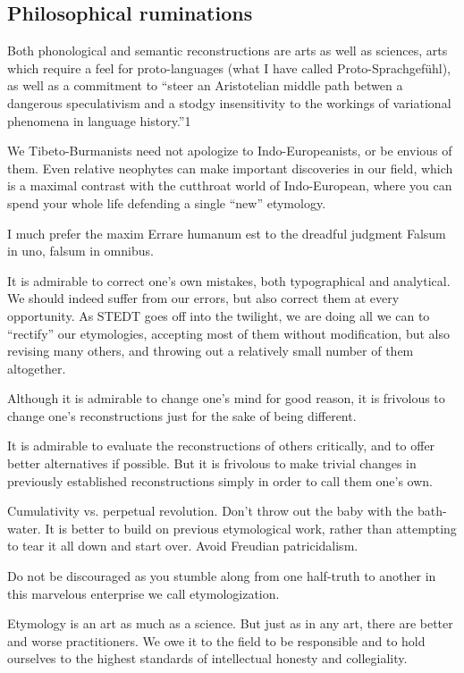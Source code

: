 \subsection{Philosophical ruminations}

Both phonological and semantic reconstructions are arts as well as sciences, arts which require a feel for proto-languages (what I have called Proto-Sprachgefühl), as well as a commitment to “steer an Aristotelian middle path betwen a dangerous speculativism and a stodgy insensitivity to the workings of variational phenomena in language history.”1 

We Tibeto-Burmanists need not apologize to Indo-Europeanists, or be envious of them. Even relative neophytes can make important discoveries in our field, which is a maximal contrast with the cutthroat world of Indo-European, where you can spend your whole life defending a single “new” etymology.

I much prefer the maxim Errare humanum est to the dreadful judgment Falsum in uno, falsum in omnibus.

It is admirable to correct one’s own mistakes, both typographical and analytical. We should indeed suffer from our errors, but also correct them at every opportunity. As STEDT goes off into the twilight, we are doing all we can to “rectify” our etymologies, accepting most of them without modification, but also revising many others, and throwing out a relatively small number of them altogether.

Although it is admirable to change one’s mind for good reason, it is frivolous to change one’s reconstructions just for the sake of being different.

It is admirable to evaluate the reconstructions of others critically, and to offer better alternatives if possible. But it is frivolous to make trivial changes in previously established reconstructions simply in order to call them one’s own.

Cumulativity vs. perpetual revolution. Don’t throw out the baby with the bath-water. It is better to build on previous etymological work, rather than attempting to tear it all down and start over. Avoid Freudian patricidalism.

Do not be discouraged as you stumble along from one half-truth to another in this marvelous enterprise we call etymologization.

Etymology is an art as much as a science. But just as in any art, there are better and worse practitioners. We owe it to the field to be responsible and to hold ourselves to the highest standards of intellectual 
honesty and collegiality.


